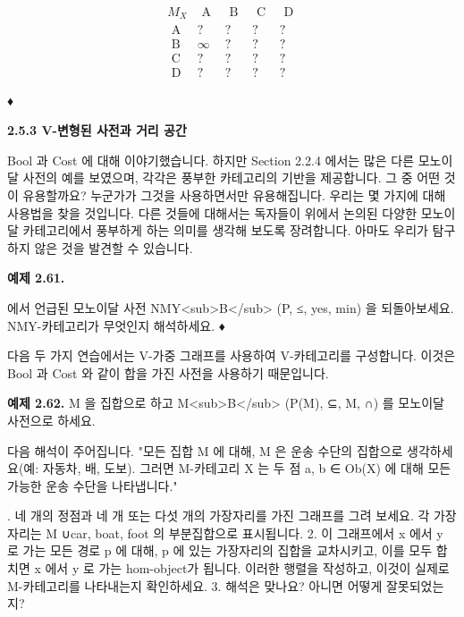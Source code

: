 \documentclass[11pt, a4paper, twoside, openany]{book}
\begin{document}
{\par\medskip
$$
\begin{array}{c|cccc}
M_{X} & \text { A } & \text { B } & \text { C } & \text { D } \\
\hline
\text { A } & ? & ? & ? & ? \\
\text { B } & \infty & ? & ? & ? \\
\text { C } & ? & ? & ? & ? \\
\text { D } & ? & ? & ? & ?
\end{array}
$$

\par\medskip
♦

\par\medskip
\textbf{2.5.3 V-변형된 사전과 거리 공간}

\par\medskip
Bool 과 Cost 에 대해 이야기했습니다. 하지만 Section 2.2.4 에서는 많은 다른 모노이달 사전의 예를 보였으며, 각각은 풍부한 카테고리의 기반을 제공합니다. 그 중 어떤 것이 유용할까요? 누군가가 그것을 사용하면서만 유용해집니다. 우리는 몇 가지에 대해 사용법을 찾을 것입니다. 다른 것들에 대해서는 독자들이 위에서 논의된 다양한 모노이달 카테고리에서 풍부하게 하는 의미를 생각해 보도록 장려합니다. 아마도 우리가 탐구하지 않은 것을 발견할 수 있습니다.

\par\medskip
\textbf{예제 2.61.}  
\begin{exercisebox}[Exercise 2.34]
에서 언급된 모노이달 사전 NMY<sub>B</sub> (P, ≤, yes, min) 을 되돌아보세요. NMY-카테고리가 무엇인지 해석하세요.
♦
\end{exercisebox}

\par\medskip
다음 두 가지 연습에서는 V-가중 그래프를 사용하여 V-카테고리를 구성합니다. 이것은 Bool 과 Cost 와 같이 합을 가진 사전을 사용하기 때문입니다.

\par\medskip
\textbf{예제 2.62.}  M 을 집합으로 하고 M<sub>B</sub> (P(M), ⊆, M, ∩) 를 모노이달 사전으로 하세요.

\par\medskip
다음 해석이 주어집니다. "모든 집합 M 에 대해, M 은 운송 수단의 집합으로 생각하세요(예: 자동차, 배, 도보). 그러면 M-카테고리 X 는 두 점 a, b ∈ Ob(X) 에 대해 모든 가능한 운송 수단을 나타냅니다."

\par{}. 네 개의 정점과 네 개 또는 다섯 개의 가장자리를 가진 그래프를 그려 보세요. 각 가장자리는 M ∪{car, boat, foot} 의 부분집합으로 표시됩니다.
2. 이 그래프에서 x 에서 y 로 가는 모든 경로 p 에 대해, p 에 있는 가장자리의 집합을 교차시키고, 이를 모두 합치면 x 에서 y 로 가는 hom-object\hspace{0pt}가 됩니다. 이러한 행렬을 작성하고, 이것이 실제로 M-카테고리를 나타내는지 확인하세요.
3. 해석은 맞나요? 아니면 어떻게 잘못되었는지?

}
\end{document}
